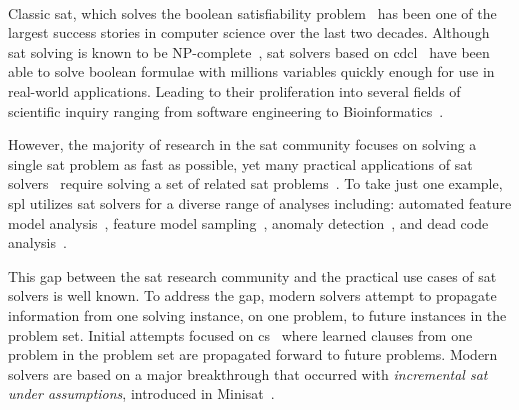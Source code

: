 ~\label{sec:introduction}


Classic \ac{sat}, which solves the boolean satisfiability
problem~\cite{10.5555/1550723} has been one of the largest success stories in
computer science over the last two decades. Although \ac{sat} solving is known
to be NP-complete~\cite{10.1145/800157.805047}, \ac{sat} solvers based on
\ac{cdcl}~\cite{Marques-Silva:1999:GSA:304491.304506,Silva:1997:GNS:244522.244560,10.5555/1867406.1867438}
have been able to solve boolean formulae with millions variables quickly enough
for use in real-world applications\cite{10.5555/1557461}. Leading to their
proliferation into several fields of scientific inquiry ranging from software
engineering to
Bioinformatics~\cite{10.1007/11814948_16,10.1007/978-3-642-31612-8_12}.

However, the majority of research in the \ac{sat} community focuses on solving a
single \ac{sat} problem as fast as possible, yet many practical applications of
\ac{sat}
solvers~\cite{silva1997robust,10.1007/3-540-44798-9_4,10.1145/378239.379019,10.1145/1698759.1698762,Een_asingle-instance,een2003temporal,10.5555/1998496.1998520}
require solving a set of related \ac{sat}
problems~\cite{10.1007/3-540-44798-9_4, silva1997robust, een2003temporal}. To
take just one example, \ac{spl} utilizes \ac{sat} solvers for a diverse range of
analyses including: automated feature model
analysis~\cite{useBTRC05,GBT+19,TAK+:CSUR14}, feature model
sampling~\cite{MKR+:ICSE16,VAT+:SPLC18}, anomaly
detection~\cite{AKTS:FOSD16,KAT:TR16,MNS+:SPLC17}, and dead code
analysis~\cite{TLSS:EuroSys11}.

This gap between the \ac{sat} research community and the practical use cases of
\ac{sat} solvers is well known. To address the gap, modern solvers attempt to
propagate information from one solving instance, on one problem, to future
instances in the problem set. Initial attempts focused on
\ac{cs}~\cite{10.1007/3-540-44798-9_4,10.1145/378239.379019} where learned
clauses from one problem in the problem set are propagated forward to future
problems. Modern solvers are based on a major breakthrough that occurred with
\emph{incremental \ac{sat} under assumptions}, introduced in
Minisat~\cite{10.1007/978-3-540-24605-3_37}.

